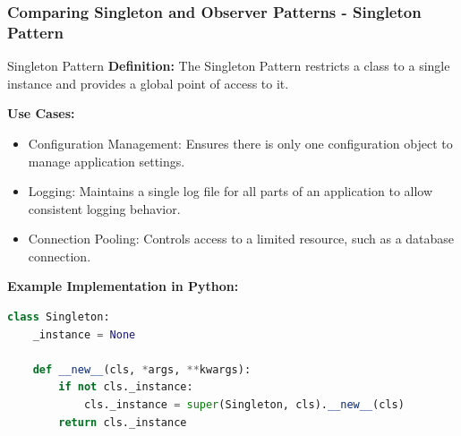 \documentclass{beamer}
\begin{document}
\begin{frame}[fragile]
    \frametitle{Comparing Singleton and Observer Patterns - Singleton Pattern}
    \begin{block}{Singleton Pattern}
        \textbf{Definition:} The Singleton Pattern restricts a class to a single instance and provides a global point of access to it.
        
        \textbf{Use Cases:}
        \begin{itemize}
            \item Configuration Management: Ensures there is only one configuration object to manage application settings.
            \item Logging: Maintains a single log file for all parts of an application to allow consistent logging behavior.
            \item Connection Pooling: Controls access to a limited resource, such as a database connection.
        \end{itemize}
        
        \textbf{Example Implementation in Python:}
        \begin{lstlisting}[language=Python]
class Singleton:
    _instance = None

    def __new__(cls, *args, **kwargs):
        if not cls._instance:
            cls._instance = super(Singleton, cls).__new__(cls)
        return cls._instance
        \end{lstlisting}
    \end{block}
\end{frame}
\end{document}
